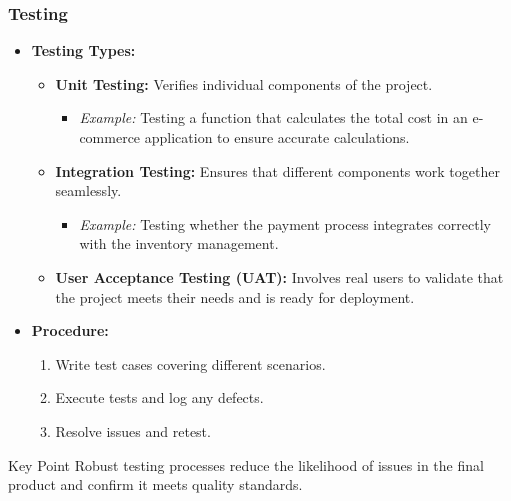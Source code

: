 \documentclass{beamer}
\begin{document}
\begin{frame}[fragile]
    \frametitle{Testing}
    \begin{itemize}
        \item \textbf{Testing Types:}
        \begin{itemize}
            \item \textbf{Unit Testing:} Verifies individual components of the project. 
                \begin{itemize}
                    \item \textit{Example:} Testing a function that calculates the total cost in an e-commerce application to ensure accurate calculations.
                \end{itemize}
            \item \textbf{Integration Testing:} Ensures that different components work together seamlessly.
                \begin{itemize}
                    \item \textit{Example:} Testing whether the payment process integrates correctly with the inventory management.
                \end{itemize}
            \item \textbf{User Acceptance Testing (UAT):} Involves real users to validate that the project meets their needs and is ready for deployment.
        \end{itemize}
        \item \textbf{Procedure:}
        \begin{enumerate}
            \item Write test cases covering different scenarios.
            \item Execute tests and log any defects.
            \item Resolve issues and retest.
        \end{enumerate}
    \end{itemize}
    \begin{block}{Key Point}
        Robust testing processes reduce the likelihood of issues in the final product and confirm it meets quality standards.
    \end{block}
\end{frame}
\end{document}
